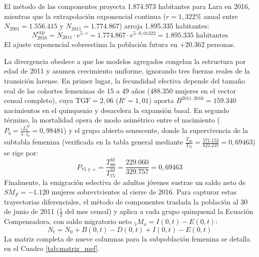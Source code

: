 \documentclass[12pt,letterpaper]{article}
\begin{document}
El método de las componentes proyecta 1.874.973 habitantes para Lara en 2016, mientras que la extrapolación exponencial continua ($r = 1{,}322\%$ anual entre $N_{2001} = 1.556.415$ y $N_{2011} = 1.774.867$) arroja 1.895.335 habitantes:
\begin{equation}
N_{2016}^{\text{exp}} = N_{2011} \cdot e^{5 \cdot r} = 1.774.867 \cdot e^{5 \cdot 0{,}01322} = 1.895.335\text{ habitantes}
\end{equation}
El ajuste exponencial sobreestima la población futura en $+20.362$ personas.

La divergencia obedece a que los modelos agregados congelan la estructura por edad de 2011 y asumen crecimiento uniforme, ignorando tres fuerzas reales de la transición larense. En primer lugar, la fecundidad efectiva depende del tamaño real de las cohortes femeninas de 15 a 49 años ($488.350$ mujeres en el vector censal completo), cuya $\text{TGF} = 2{,}06$ ($R' = 1{,}01$) aporta $B^{2011\text{--}2016} = 159.340$ nacimientos en el quinquenio y desacelera la expansión basal. En segundo término, la mortalidad opera de modo asimétrico entre el nacimiento ($P_b = \frac{{}_{5}L^M_0}{5 \cdot l_0} = 0{,}98481$) y el grupo abierto senescente, donde la supervivencia de la subtabla femenina (verificada en la tabla general mediante $\frac{T_{80}}{T_{75}} = \frac{571.152}{822.237} = 0{,}69463$) se rige por:
\begin{equation}
P_{75\text{ y +}} = \dfrac{T^M_{80}}{T^M_{75}} = \dfrac{229.060}{329.757} = 0{,}69463
\end{equation}
Finalmente, la emigración selectiva de adultos jóvenes sustrae un saldo neto de $SM_F = -1.120$ mujeres sobrevivientes al cierre de 2016. Para capturar estas trayectorias diferenciales, el método de componentes traslada la población al 30 de junio de 2011 ($\frac{1}{2}$ del mes censal) y aplica a cada grupo quinquenal la Ecuación Compensadora, con saldo migratorio neto ${}_{5}M_x = I(0,t) - E(0,t)$:
\begin{equation}
N_t = N_0 + B(0,t) - D(0,t) + I(0,t) - E(0,t)
\end{equation}
La matriz completa de nueve columnas para la subpoblación femenina se detalla en el Cuadro \ref{tab:matriz_mef}.
\end{document}

